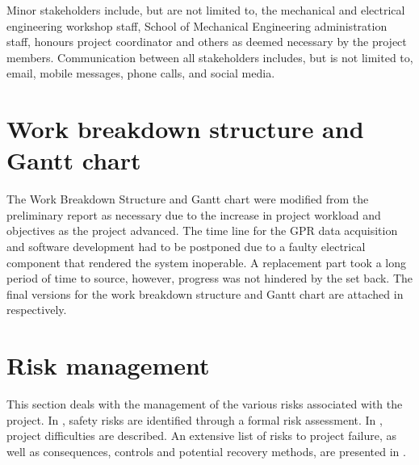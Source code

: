 \documentclass[main.tex]{subfiles}
\begin{document}
Minor stakeholders include, but are not limited to, the mechanical and electrical engineering workshop staff, School of Mechanical Engineering administration staff, honours project coordinator and others as deemed necessary by the project members. Communication between all stakeholders includes, but is not limited to, email, mobile messages, phone calls, and social media. %

\section{Work breakdown structure and Gantt chart}
The Work Breakdown Structure and Gantt chart were modified from the preliminary report as necessary due to the increase in project workload and objectives as the project advanced. The time line for the GPR data acquisition and software development had to be postponed due to a faulty electrical component that rendered the system inoperable. A replacement part took a long period of time to source, however, progress was not hindered by the set back. The final versions for the work breakdown structure and Gantt chart are attached in  respectively.  


\section{Risk management}
This section deals with the management of the various risks associated with the project. In , safety risks are identified through a formal risk assessment. In , project difficulties are described. An extensive list of risks to project failure, as well as consequences, controls and potential recovery methods, are presented in . 
\end{document}
